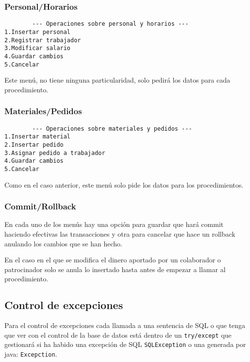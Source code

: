 \subsubsection{Personal/Horarios}
\begin{lstlisting}
		--- Operaciones sobre personal y horarios ---
1.Insertar personal
2.Registrar trabajador
3.Modificar salario
4.Guardar cambios
5.Cancelar
\end{lstlisting}

Este menú, no tiene ninguna particularidad, solo pedirá los datos para cada
procedimiento.

\subsubsection{Materiales/Pedidos}
\begin{lstlisting}
		--- Operaciones sobre materiales y pedidos ---
1.Insertar material
2.Insertar pedido
3.Asignar pedido a trabajador
4.Guardar cambios
5.Cancelar
\end{lstlisting}

Como en el caso anterior, este menú solo pide los datos para los procedimientos.

\subsubsection{Commit/Rollback}
En cada uno de los menús hay una opción para guardar que hará commit haciendo
efectivas las transacciones y otra para cancelar que hace un rollback anulando
los cambios que se han hecho.

En el caso en el que se modifica el dinero aportado por un colaborador o
patrocinador solo se anula lo insertado hasta antes de empezar a llamar al
procedimiento.

\subsection{Control de excepciones}
Para el control de excepciones cada llamada a una sentencia de SQL o que tenga
que ver con el control de la base de datos está dentro de un \texttt{try/except}
que gestionará si ha habido una excepción de SQL \texttt{SQLException} o una
generada por java: \texttt{Excepction}.
